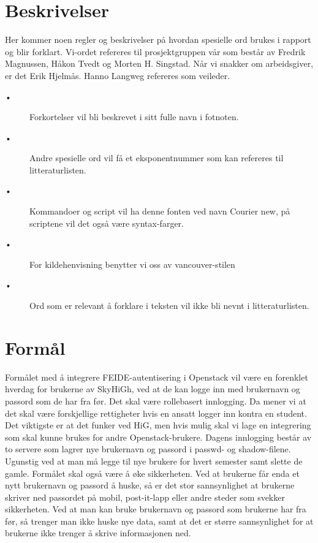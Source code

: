 \section{Beskrivelser}
Her kommer noen regler og beskrivelser på hvordan spesielle ord brukes i rapport og blir forklart. \newline \newline
Vi-ordet refereres til prosjektgruppen vår som består av Fredrik Magnussen, Håkon Tvedt og Morten H. Singstad. Når vi snakker om arbeidsgiver, er det Erik Hjelmås. Hanno Langweg refereres som veileder.
\begin{description}
\item[\tab •] Forkortelser vil bli beskrevet i sitt fulle navn i fotnoten.
\item[\tab •] Andre spesielle ord vil få et eksponentnummer som kan refereres til litteraturlisten.
\item[\tab •] Kommandoer og script vil ha denne fonten ved navn Courier new, på scriptene vil det også være syntax-farger.
\item[\tab •] For kildehenvisning benytter vi oss av vancouver-stilen \cite{vancouver}
\item[\tab •] Ord som er relevant å forklare i teksten vil ikke bli nevnt i litteraturlisten.
\end{description}

\section{Formål}
Formålet med å integrere FEIDE-autentisering i Openstack vil være en forenklet hverdag for brukerne av SkyHiGh\cite{skyhigh}, ved at de kan logge inn med brukernavn og passord som de har fra før. Det skal være rollebasert innlogging. Da mener vi at det skal være forskjellige rettigheter hvis en ansatt logger inn kontra en student. Det viktigste er at det funker ved HiG, men hvis mulig skal vi lage en integrering som skal kunne brukes for andre Openstack-brukere. Dagens innlogging består av to servere som lagrer nye brukernavn og passord i passwd- og shadow-filene. Ugunstig ved at man må legge til nye brukere for hvert semester samt slette de gamle. 
\newline \newline
Formålet skal også være å øke sikkerheten. Ved at brukerne får enda et nytt brukernavn og passord å huske, så er det stor sannsynlighet at brukerne skriver ned passordet på mobil, post-it-lapp eller andre steder som svekker sikkerheten. Ved at man kan bruke brukernavn og passord som brukerne har fra før, så trenger man ikke huske nye data, samt at det er større sannsynlighet for at brukerne ikke trenger å skrive informasjonen ned.


